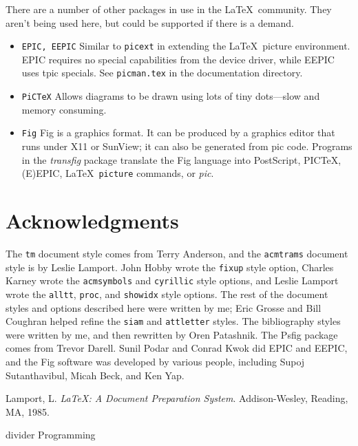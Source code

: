 There are a number of other packages in use in the \LaTeX\ community.
They aren't being used here, but could be supported if there is
a demand.

\begin{itemize}
\item[] \hbox{\tt EPIC, EEPIC}
Similar to {\tt picext} in extending the \LaTeX\ picture environment.
EPIC requires no special capabilities from the device driver,
while EEPIC uses tpic specials.
See \verb|picman.tex| in the documentation directory.
\item[] \hbox{\tt PiC\TeX}
Allows diagrams to be drawn using lots of tiny dots---slow and
memory consuming.
\item[] \hbox{\tt Fig}
Fig is a graphics format.
It can be produced by a graphics editor that runs under X11 or SunView;
it can also be generated from pic code.
Programs in the {\em transfig\/} package translate
the Fig language into PostScript, PIC\TeX, (E)EPIC,
\LaTeX\ \verb|picture| commands, or {\em pic\/}.
\end{itemize}

\section{Acknowledgments}

The {\tt tm} document style comes from Terry Anderson,
and the {\tt acmtrams} document style is by Leslie Lamport.
John Hobby wrote the {\tt fixup} style option,
Charles Karney wrote the {\tt acmsymbols} and {\tt cyrillic}
style options,
and Leslie Lamport wrote the {\tt alltt}, {\tt proc}, and {\tt showidx}
style options.
The rest of the document styles and options described here
were written by me;
Eric Grosse and Bill Coughran helped refine the {\tt siam}
and {\tt attletter} styles.
The bibliography styles were written by me, and then
rewritten by Oren Patashnik.
The Psfig package comes from Trevor Darell.
Sunil Podar and Conrad Kwok did EPIC and EEPIC,
and the Fig software was developed by various people,
including Supoj Sutanthavibul, Micah Beck, and Ken Yap.

\begin{thebibliography}{9}
 Lamport, L. {\em \LaTeX: A Document Preparation System}.
	Addison-Wesley, Reading, MA, 1985.
\end{thebibliography}

\newpage
\null
\vspace{3in}
\Large divider
\vspace{1in}
\Large Programming

\newpage
\null


